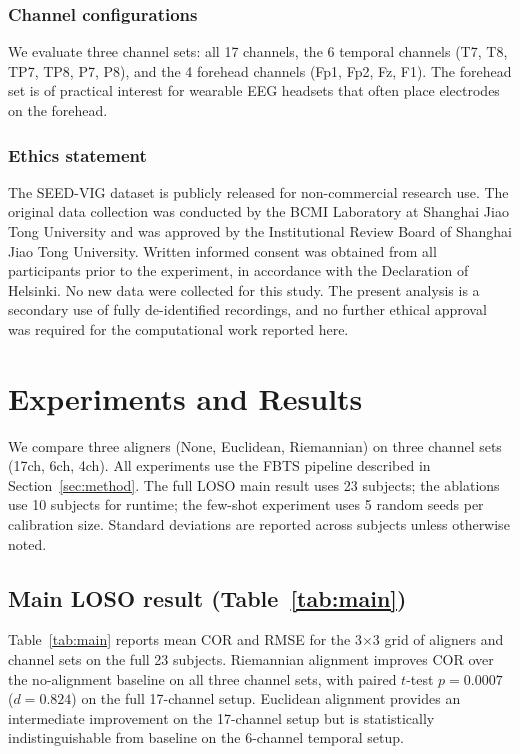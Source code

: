 \documentclass[journal,twoside,web]{ieeecolor2}
\begin{document}
\subsubsection{Channel configurations} We evaluate three channel sets:
all 17 channels, the 6 temporal channels (T7, T8, TP7, TP8, P7, P8),
and the 4 forehead channels (Fp1, Fp2, Fz, F1). The forehead set is of
practical interest for wearable EEG headsets that often place
electrodes on the forehead.

\subsubsection{Ethics statement} The SEED-VIG dataset
\cite{zheng2017} is publicly released for non-commercial research use.
The original data collection was conducted by the BCMI Laboratory at
Shanghai Jiao Tong University and was approved by the Institutional
Review Board of Shanghai Jiao Tong University. Written informed consent
was obtained from all participants prior to the experiment, in
accordance with the Declaration of Helsinki. No new data were collected
for this study. The present analysis is a secondary use of fully
de-identified recordings, and no further ethical approval was required
for the computational work reported here.

\section{Experiments and Results}
\label{sec:exp}

We compare three aligners (None, Euclidean, Riemannian) on three
channel sets (17ch, 6ch, 4ch). All experiments use the FBTS pipeline
described in Section~\ref{sec:method}. The full LOSO main result uses
23 subjects; the ablations use 10 subjects for runtime; the few-shot
experiment uses 5 random seeds per calibration size. Standard deviations
are reported across subjects unless otherwise noted.

\subsection{Main LOSO result (Table~\ref{tab:main})}

Table~\ref{tab:main} reports mean COR and RMSE for the 3$\times$3 grid
of aligners and channel sets on the full 23 subjects. Riemannian
alignment improves COR over the no-alignment baseline on all three
channel sets, with paired $t$-test $p=0.0007$ ($d=0.824$) on the full
17-channel setup. Euclidean alignment provides an intermediate
improvement on the 17-channel setup but is statistically
indistinguishable from baseline on the 6-channel temporal setup.
\end{document}

